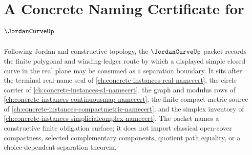\chapter{A Concrete Naming Certificate for $\JordanCurveUp$}
\label{ch:concrete-instances-jordan-curve-namecert}

Following Jordan and constructive topology, the $\JordanCurveUp$ packet records the finite polygonal and winding-ledger route by which a displayed simple closed curve in the real plane may be consumed as a separation boundary. It sits after the terminal real-name seal of \autoref{ch:concrete-instances-real-namecert}, the circle carrier of \autoref{ch:concrete-instances-s1-namecert}, the graph and modulus rows of \autoref{ch:concrete-instances-continuousmap-namecert}, the finite compact-metric source of \autoref{ch:concrete-instances-compactmetric-namecert}, and the simplex inventory of \autoref{ch:concrete-instances-simplicialcomplex-namecert}. The packet names a constructive finite obligation surface; it does not import classical open-cover compactness, selected complementary components, quotient path equality, or a choice-dependent separation theorem.

